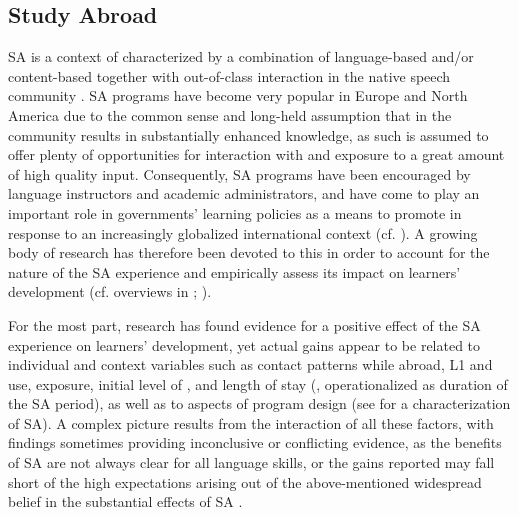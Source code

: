 \documentclass[output=paper]{langsci/langscibook}
\begin{document}
  
\subsection{Study Abroad}


SA is a context of   characterized by a combination of language-based and/or content-based  together with out-of-class interaction in the native speech community \citep[5]{Freed1995book}. SA programs have become very popular in Europe and North America due to the common sense and long-held assumption that  in the  community results in substantially enhanced  knowledge, as such  is assumed to offer plenty of opportunities for interaction with  and exposure to a great amount of high quality input. Consequently, SA programs have been encouraged by language instructors and academic administrators, and have come to play an important role in governments’  learning policies as a means to promote  in response to an increasingly globalized international context (cf. \citealt{Kinginger2009}). A growing body of research has therefore been devoted to this  in order to account for the nature of the SA experience and empirically assess its impact on  learners’  development (cf. overviews in \citealt{Freed1995book}; \citealt{DuFonChurchill2006}). 

For the most part, research has found evidence for a positive effect of the SA experience on learners’  development, yet actual  gains appear to be related to individual and context variables such as contact patterns while abroad, L1 and  use,  exposure, initial level of  , and length of stay (, operationalized as duration of the SA period), as well as to aspects of program design (see \citealt{Pérez-VidalJuan-Garau2011} for a characterization of SA). A complex picture results from the interaction of all these factors, with findings sometimes providing inconclusive or conflicting evidence, as the benefits of SA are not always clear for all language skills, or the gains reported may fall short of the high expectations arising out of the above-mentioned widespread belief in the substantial effects of SA .
\end{document}
